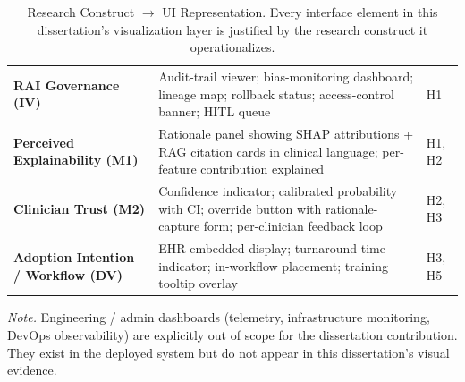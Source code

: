 {\tablestripes\tablefontsize
{}
\begin{xltabular}{\textwidth}{@{} >{\raggedright\arraybackslash}p{4.1cm} p{8.1cm} >{\centering\arraybackslash}p{2.1cm} @{}}
\caption[Research-to-UI Mapping]{Research Construct $\to$ UI Representation. Every interface element in this dissertation's visualization layer is justified by the research construct it operationalizes.}\label{tab:dash_research_ui_map} \\
\toprule
{} &  &  \\
\midrule
\endfirsthead
\endhead
\bottomrule
\endlastfoot
\textbf{RAI Governance (IV)}            & Audit-trail viewer; bias-monitoring dashboard; lineage map; rollback status; access-control banner; HITL queue              & H1 \\
\textbf{Perceived Explainability (M1)}  & Rationale panel showing SHAP attributions + RAG citation cards in clinical language; per-feature contribution explained     & H1, H2 \\
\textbf{Clinician Trust (M2)}           & Confidence indicator; calibrated probability with CI; override button with rationale-capture form; per-clinician feedback loop & H2, H3 \\
\textbf{Adoption Intention / Workflow (DV)} & EHR-embedded display; turnaround-time indicator; in-workflow placement; training tooltip overlay                                & H3, H5 \\
\end{xltabular}}
\vspace{0.4em}
\noindent\textit{Note.} Engineering / admin dashboards (telemetry, infrastructure monitoring, DevOps observability) are explicitly out of scope for the dissertation contribution. They exist in the deployed system but do not appear in this dissertation's visual evidence.

